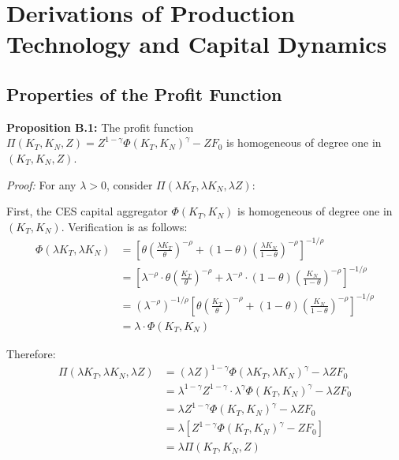 \documentclass[12pt,a4paper]{article}
\begin{document}
\section{Derivations of Production Technology and Capital Dynamics}\label{app:B}

\subsection{Properties of the Profit Function}
\textbf{Proposition B.1:} The profit function $\Pi(K_T, K_N, Z) = Z^{1-\gamma}\Phi(K_T, K_N)^\gamma - ZF_0$ is homogeneous of degree one in $(K_T, K_N, Z)$.

\textit{Proof:}
For any $\lambda > 0$, consider $\Pi(\lambda K_T, \lambda K_N, \lambda Z)$:

First, the CES capital aggregator $\Phi(K_T, K_N)$ is homogeneous of degree one in $(K_T, K_N)$. Verification is as follows:
\begin{equation}
\begin{aligned}
\Phi(\lambda K_T, \lambda K_N) &= \left[ \theta \left( \frac{\lambda K_T}{\theta} \right)^{-\rho} + (1-\theta) \left( \frac{\lambda K_N}{1-\theta} \right)^{-\rho} \right]^{-1/\rho} \\
&= \left[ \lambda^{-\rho} \cdot \theta \left( \frac{K_T}{\theta} \right)^{-\rho} + \lambda^{-\rho} \cdot (1-\theta) \left( \frac{K_N}{1-\theta} \right)^{-\rho} \right]^{-1/\rho} \\
&= (\lambda^{-\rho})^{-1/\rho} \left[ \theta \left( \frac{K_T}{\theta} \right)^{-\rho} + (1-\theta) \left( \frac{K_N}{1-\theta} \right)^{-\rho} \right]^{-1/\rho} \\
&= \lambda \cdot \Phi(K_T, K_N)
\end{aligned}
\end{equation}

Therefore:
\begin{equation}
\begin{aligned}
\Pi(\lambda K_T, \lambda K_N, \lambda Z) &= (\lambda Z)^{1-\gamma} \Phi(\lambda K_T, \lambda K_N)^\gamma - \lambda ZF_0 \\
&= \lambda^{1-\gamma} Z^{1-\gamma} \cdot \lambda^\gamma \Phi(K_T, K_N)^\gamma - \lambda ZF_0 \\
&= \lambda Z^{1-\gamma} \Phi(K_T, K_N)^\gamma - \lambda ZF_0 \\
&= \lambda \left[ Z^{1-\gamma} \Phi(K_T, K_N)^\gamma - ZF_0 \right] \\
&= \lambda \Pi(K_T, K_N, Z) \quad 
\end{aligned}
\end{equation}
\end{document}
